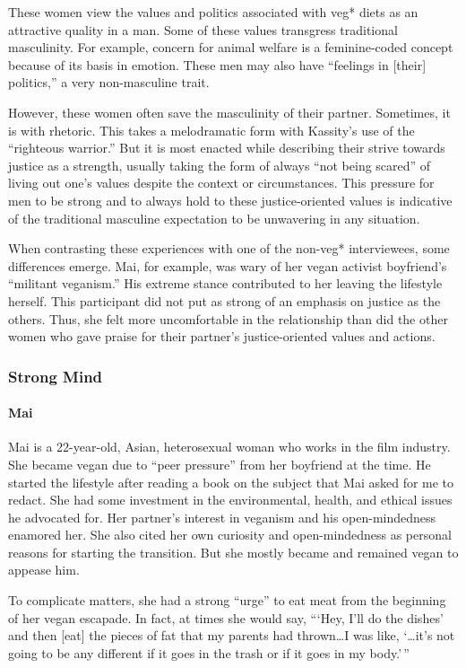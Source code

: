 \documentclass[twoside]{report}
\begin{document}
\begin{multicols*}{2}
These women view the values and politics associated with veg* diets as
an attractive quality in a man. Some of these values transgress
traditional masculinity. For example, concern for animal welfare is a
feminine-coded concept because of its basis in emotion. These men may
also have ``feelings in {[}their{]} politics,'' a very non-masculine
trait.

However, these women often save the masculinity of their partner.
Sometimes, it is with rhetoric. This takes a melodramatic form with
Kassity's use of the ``righteous warrior.'' But it is most enacted while
describing their strive towards justice as a strength, usually taking
the form of always ``not being scared'' of living out one's values
despite the context or circumstances. This pressure for men to be strong
and to always hold to these justice-oriented values is indicative of the
traditional masculine expectation to be unwavering in any situation.

When contrasting these experiences with one of the non-veg*
interviewees, some differences emerge. Mai, for example, was wary of her
vegan activist boyfriend's ``militant veganism.'' His extreme stance
contributed to her leaving the lifestyle herself. This participant did not put
as strong of an emphasis on justice as the others. Thus, she
felt more uncomfortable in the relationship than did the other women who
gave praise for their partner's justice-oriented values and actions.

\subsubsection{Strong Mind}

\paragraph{Mai}

Mai is a 22-year-old, Asian, heterosexual woman who works in the film
industry. She became vegan due to ``peer pressure'' from her boyfriend
at the time. He started the lifestyle after reading a book on the subject that Mai asked for me to redact. She had some investment in the environmental, health, and ethical issues he advocated for. Her partner's interest in veganism and his open-mindedness enamored her. She also cited her own curiosity and open-mindedness as personal reasons
for starting the transition. But she mostly became and remained vegan to appease him. 

To complicate matters, she had a strong ``urge'' to eat meat from the beginning of her vegan escapade. In fact, at times she would say, ```Hey, I'll do the dishes' and then {[}eat{]} the pieces of fat that my parents had thrown\ldots{}I was like, `\ldots it's not going to be any different if
it goes in the trash or if it goes in my body.'\,''


\end{multicols*}
\end{document}
